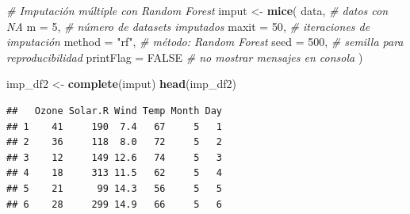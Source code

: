 \documentclass[
]{book}
\newenvironment{Shaded}{\begin{snugshade}}{\end{snugshade}}
\newcommand{\AttributeTok}[1]{\textcolor[rgb]{0.13,0.29,0.53}{#1}}
\newcommand{\CommentTok}[1]{\textcolor[rgb]{0.56,0.35,0.01}{\textit{#1}}}
\newcommand{\ConstantTok}[1]{\textcolor[rgb]{0.56,0.35,0.01}{#1}}
\newcommand{\DecValTok}[1]{\textcolor[rgb]{0.00,0.00,0.81}{#1}}
\newcommand{\FunctionTok}[1]{\textcolor[rgb]{0.13,0.29,0.53}{\textbf{#1}}}
\newcommand{\NormalTok}[1]{#1}
\newcommand{\OtherTok}[1]{\textcolor[rgb]{0.56,0.35,0.01}{#1}}
\newcommand{\StringTok}[1]{\textcolor[rgb]{0.31,0.60,0.02}{#1}}
\begin{document}
\begin{Shaded}
\begin{Highlighting}[]
\CommentTok{\# Imputación múltiple con Random Forest}
\NormalTok{imput }\OtherTok{\textless{}{-}} \FunctionTok{mice}\NormalTok{(}
\NormalTok{  data,             }\CommentTok{\# datos con NA}
  \AttributeTok{m =} \DecValTok{5}\NormalTok{,            }\CommentTok{\# número de datasets imputados}
  \AttributeTok{maxit =} \DecValTok{50}\NormalTok{,       }\CommentTok{\# iteraciones de imputación}
  \AttributeTok{method =} \StringTok{"rf"}\NormalTok{,    }\CommentTok{\# método: Random Forest}
  \AttributeTok{seed =} \DecValTok{500}\NormalTok{,       }\CommentTok{\# semilla para reproducibilidad}
  \AttributeTok{printFlag =} \ConstantTok{FALSE} \CommentTok{\# no mostrar mensajes en consola}
\NormalTok{)}

\NormalTok{imp\_df2 }\OtherTok{\textless{}{-}} \FunctionTok{complete}\NormalTok{(imput)}
\FunctionTok{head}\NormalTok{(imp\_df2)}
\end{Highlighting}
\end{Shaded}

\begin{verbatim}
##   Ozone Solar.R Wind Temp Month Day
## 1    41     190  7.4   67     5   1
## 2    36     118  8.0   72     5   2
## 3    12     149 12.6   74     5   3
## 4    18     313 11.5   62     5   4
## 5    21      99 14.3   56     5   5
## 6    28     299 14.9   66     5   6
\end{verbatim}
\end{document}
